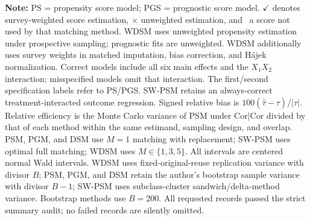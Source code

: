 \begin{table}
\begin{tabular}{@{} >{\centering\arraybackslash}p{1.3cm} l c c *{4}{c} *{4}{c} *{4}{c} @{}}
\bottomrule
\end{tabular}
\vspace{0.5em}
\begin{minipage}{\textwidth}
\footnotesize
\textbf{Note:} PS = propensity score model; PGS = prognostic score model. $\checkmark$ denotes survey-weighted score estimation, $\times$ unweighted estimation, and \textendash\, a score not used by that matching method. WDSM uses unweighted propensity estimation under prospective sampling; prognostic fits are unweighted. WDSM additionally uses survey weights in matched imputation, bias correction, and H\'ajek normalization. Correct models include all six main effects and the $X_1X_2$ interaction; misspecified models omit that interaction. The first/second specification labels refer to PS/PGS. SW-PSM retains an always-correct treatment-interacted outcome regression. Signed relative bias is $100(\overline{\widehat\tau}-\tau)/|\tau|$. Relative efficiency is the Monte Carlo variance of PSM under Cor|Cor divided by that of each method within the same estimand, sampling design, and overlap. PSM, PGM, and DSM use $M=1$ matching with replacement; SW-PSM uses optimal full matching; WDSM uses $M\in\{1,3,5\}$. All intervals are centered normal Wald intervals. WDSM uses fixed-original-reuse replication variance with divisor $B$; PSM, PGM, and DSM retain the author's bootstrap sample variance with divisor $B-1$; SW-PSM uses subclass-cluster sandwich/delta-method variance. Bootstrap methods use $B=200$. All requested records passed the strict summary audit; no failed records are silently omitted.
\end{minipage}
\end{table}
